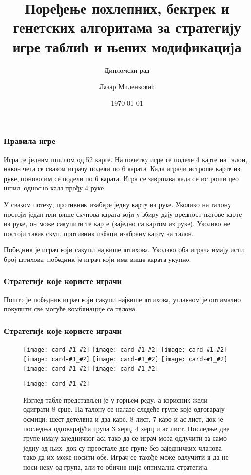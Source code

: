 \documentclass{beamer}
\newcommand{\card}[2]{\texttt{[image: card-\#1\_\#2]}}
\begin{document}
\renewcommand{\contentsname}{Садржај}
\renewcommand{\refname}{Литература}
\renewcommand{\abstractname}{Апстракт}
\renewcommand{\figurename}{Слика}
\renewcommand{\appendixtocname}{Додаци}
\renewcommand{\lstlistingname}{Датотека}
\renewcommand{\tablename}{Табела}
\renewcommand{\proofname}{Доказ}


\title{Поређење похлепних, бектрек и генетских алгоритама за стратегиjу игре таблић и њених модификациjа}
\subtitle{Дипломски рад}
\author{Лазар Миленковић}
\date{\today}

\begin{frame}
	\titlepage
\end{frame}

\begin{frame}
\frametitle{Правила игре}
Игра се једним шпилом од 52 карте. На почетку игре се поделе 4 карте на талон, након чега се сваком играчу подели по 6 карата. Када играчи истроше карте из руке, поново им се подели по 6 карата. Игра се завршава када се истроши цео шпил, односно када прођу 4 руке.

У сваком потезу, противник изабере једну карту из руке. Уколико на талону постоји један или више скупова карата који у збиру дају вредност његове карте из руке, он може сакупити те карте (заједно са картом из руке). Уколико не постоји такав скуп, противник избаци изабрану карту на талон.

Победник је играч који сакупи највише штихова. Уколико оба играча имају исти број штихова, победник је играч који има више карата укупно.
\end{frame}

\begin{frame}
\frametitle{Стратегије које користе играчи}
Пошто је победник играч који сакупи највише штихова, углавном је оптимално покупити све могуће комбинације са талона. 
\end{frame}

\begin{frame}
\frametitle{Стратегије које користе играчи}

\begin{figure}[htbp]
	\centering
	\card{6}{club}
	\card{2}{diamond}
	\card{jack}{club}
	\card{8}{spade}
	\card{3}{heart}
	\card{7}{diamond}
	\card{4}{heart}
	\card{1}{spade}
	
	\card{8}{heart}
	\caption{Изглед табле представљен је у горњем реду, а корисник жели одиграти 8 срце. На талону се налазе следеће групе које одговарају осмици: шест детелина и два каро, 8 лист, 7 каро и ас лист, док је последња одговарајућа група 3 херц, 4 херц и ас лист. Последње две групе имају заједничког аса тако да се играч мора одлучити за само једну од њих, док су преостале две групе без заједничких чланова тако да их може носити обе. Играч се такође може одлучити и да не носи неку од група, али то обично није оптимална стратегија.}
\end{figure}
\end{frame}
\end{document}
